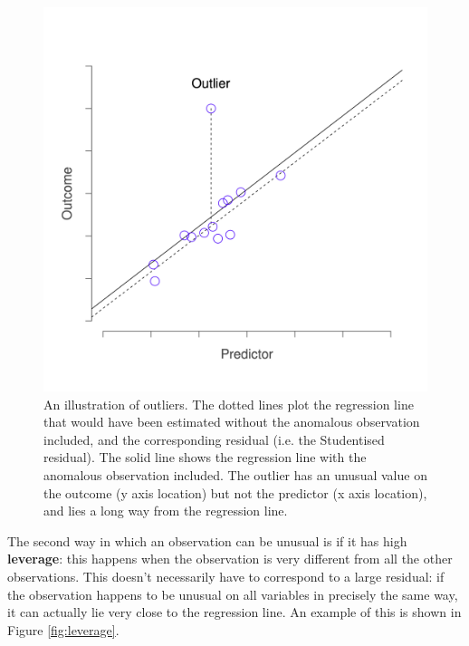 \documentclass[
]{book}
\theoremstyle{definition}
\theoremstyle{definition}
\theoremstyle{definition}
\theoremstyle{definition}
\theoremstyle{remark}
\begin{document}
\begin{figure}

{\centering \includegraphics[width=0.66\linewidth]{resources/image/unusual_outlier} 

}

\caption{An illustration of outliers. The dotted lines plot the regression line that would have been estimated without the anomalous observation included, and the corresponding residual (i.e. the Studentised residual). The solid line shows the regression line with the anomalous observation included. The outlier has an unusual value on the outcome (y axis location) but not the predictor (x axis location), and lies a long way from the regression line.}\label{fig:outlier}
\end{figure}

The second way in which an observation can be unusual is if it has high \textbf{leverage}: this happens when the observation is very different from all the other observations. This doesn't necessarily have to correspond to a large residual: if the observation happens to be unusual on all variables in precisely the same way, it can actually lie very close to the regression line. An example of this is shown in Figure \ref{fig:leverage}.
\end{document}
